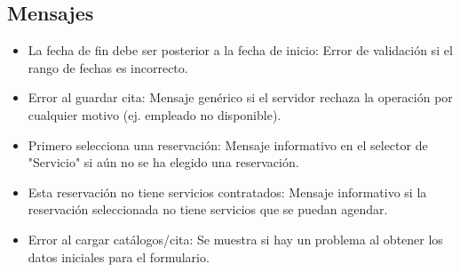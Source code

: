 \subsection{Mensajes}
\begin{itemize}
    \item La fecha de fin debe ser posterior a la fecha de inicio: Error de validación si el rango de fechas es incorrecto.
    \item Error al guardar cita: Mensaje genérico si el servidor rechaza la operación por cualquier motivo (ej. empleado no disponible).
    \item Primero selecciona una reservación: Mensaje informativo en el selector de "Servicio" si aún no se ha elegido una reservación.
    \item Esta reservación no tiene servicios contratados: Mensaje informativo si la reservación seleccionada no tiene servicios que se puedan agendar.
    \item Error al cargar catálogos/cita: Se muestra si hay un problema al obtener los datos iniciales para el formulario.
\end{itemize}
